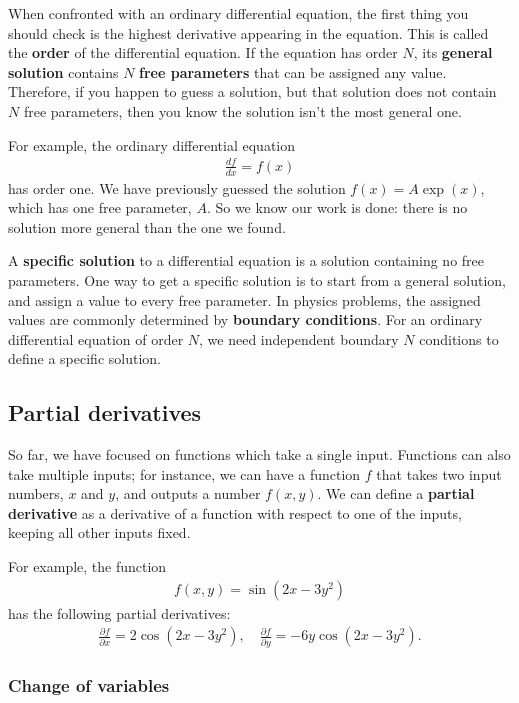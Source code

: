 \documentclass[10pt,a4paper]{article}
\begin{document}
When confronted with an ordinary differential equation, the first
thing you should check is the highest derivative appearing in the
equation.  This is called the \textbf{order} of the differential
equation.  If the equation has order $N$, its \textbf{general
  solution} contains $N$ \textbf{free parameters} that can be assigned
any value. Therefore, if you happen to guess a solution, but that
solution does not contain $N$ free parameters, then you know the
solution isn't the most general one.

For example, the ordinary differential equation
\begin{align}
  \frac{df}{dx} = f(x)
\end{align}
has order one. We have previously guessed the solution $f(x) = A
\exp(x)$, which has one free parameter, $A$.  So we know our work is
done: there is no solution more general than the one we found.

A \textbf{specific solution} to a differential equation is a solution
containing no free parameters.  One way to get a specific solution is
to start from a general solution, and assign a value to every free
parameter. In physics problems, the assigned values are commonly
determined by \textbf{boundary conditions}. For an ordinary
differential equation of order $N$, we need independent boundary $N$
conditions to define a specific solution.

\subsection{Partial derivatives}
\label{partial-derivatives}

So far, we have focused on functions which take a single
input. Functions can also take multiple inputs; for instance, we can
have a function $f$ that takes two input numbers, $x$ and $y$, and
outputs a number $f(x,y)$. We can define a \textbf{partial derivative}
as a derivative of a function with respect to one of the inputs,
keeping all other inputs fixed.

For example, the function
\begin{align}
  f(x,y) = \sin(2x - 3 y^2)
\end{align}
has the following partial derivatives:
\begin{align}
  \frac{\partial f}{\partial x} = 2\cos(2x-3y^2), \quad
  \frac{\partial f}{\partial y} = - 6y\cos(2x-3y^2).
\end{align}

\subsubsection{Change of variables}
\label{change-of-variables}
\end{document}
